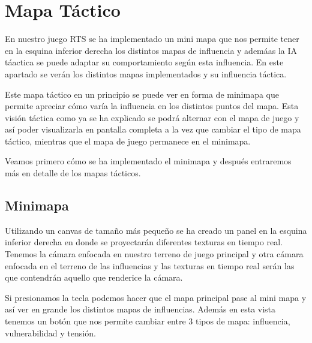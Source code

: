 \section{Mapa Táctico}

En nuestro juego RTS se ha implementado un mini mapa que nos permite tener en
la esquina inferior derecha los distintos mapas de influencia y ademáas la IA táactica se
puede adaptar su comportamiento según esta influencia. En este apartado se verán los
distintos mapas implementados y su influencia táctica.

Este mapa táctico en un principio se puede ver en forma de minimapa que permite apreciar cómo varía la influencia en los distintos puntos del mapa. Esta visión táctica como ya se ha explicado se podrá alternar con el mapa de juego y así poder visualizarla en pantalla completa a la vez que cambiar el tipo de mapa táctico, mientras que el mapa de juego permanece en el minimapa.

Veamos primero cómo se ha implementado el minimapa y después entraremos más en detalle de los mapas tácticos.

\subsection{Minimapa}

Utilizando un canvas de tamaño más pequeño se ha creado un panel en la esquina inferior derecha en donde se proyectarán diferentes texturas en tiempo real. Tenemos la cámara enfocada en nuestro terreno de juego principal y otra cámara enfocada en el terreno de las influencias y las texturas en tiempo real serán las que contendrán aquello que renderice la cámara. 

Si presionamos la tecla  podemos hacer que el mapa principal pase al mini mapa y así ver en grande los distintos mapas de influencias.  Además en esta vista tenemos un botón que nos permite cambiar entre 3 tipos de mapa: influencia, vulnerabilidad y tensión.


